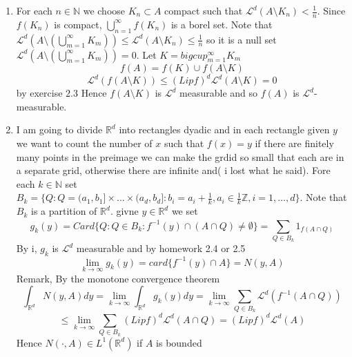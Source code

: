 \documentclass[11pt]{article}
\begin{document}
\begin{enumerate}
    \item For each $n \in \mathbb{N}$ we choose $K_n \subset A$ compact such that $ \mathcal{L}^{d}(A \setminus K_n) < \frac{1}{n}$. Since $f(K_n)$ is compact,  $\bigcup_{n=1}^{\infty}f(K_n)$ is a borel set. Note that $ \mathcal{L}^{d}(A \setminus ( \bigcup_{m=1}^{\infty}K_m)) \le \mathcal{L}^{d}(A \setminus K_n) \le \frac{1}{n}$ so
        it is a null set $ \mathcal{L}^{d}(A \setminus (\bigcup_{m=1}^{\infty}K_m)) = 0$. Let $K = bigcup_{m=1}^{\infty}K_m$ 
        \[
            f(A) = f(K) \cup f(A \setminus K)
        \] 
        \[
        \mathcal{L}^{d}(f(A \setminus K)) \le (Lip f)^{d} \mathcal{L}^{d}(A \setminus K)  = 0
        \] 
        by exercise $2.3$ 
        Hence $f(A \setminus K)$ is  $ \mathcal{L}^{d}$ measurable and so $f(A)$ is  $ \mathcal{L}^{d}$-measurable.
    \item 
        I am going to divide $ \mathbb{R}^{d}$ into rectangles dyadic and in each rectangle given $y$ we want to count the number of  $x$ such that  $f(x) = y$ if there are finitely many points in the preimage we can make the grdid so small that each are in a separate grid, otherwise there are infinite and( i lost what he said).
        Fore each  $k \in \mathbb{N}$ set  $B_k = \{Q : Q = (a_1,b_1] \times \dots \times (a_d,b_d] : b_i = a_i + \frac{1}{k}, a_i \in \frac{1}{k} \mathbb{Z}, i = 1,\dots,d\}$.
        Note that $ B_k$ is a partition of $ \mathbb{R}^{d}$. 
        givne $y \in \mathbb{R}^{d}$ we set
        \[
            g_k(y) = Card\{Q : Q \in B_k : f^{-1}(y) \cap (A \cap Q) \ne \emptyset\} = \sum_{Q \in B_k}^{}1_{f(A \cap Q)}
        \] 
        By i, $g_k$ is  $ \mathcal{L}^{d}$ measurable and by homework 2.4 or 2.5
        \[
            \lim_{k\to \infty}g_k(y) = card\{ f^{-1}(y) \cap A\} = N(y,A)
        \] 
        Remark, By the monotone convergence theorem 
        \[
        \int_{ \mathbb{R}^{d}}^{}N(y,A) dy = \lim_{k\to \infty} \int_{ \mathbb{R}^{d}}^{}g_k(y)dy = \lim_{k\to \infty} \sum_{ Q \in B_k}^{} \mathcal{L}^{d}(f^{-1}(A \cap Q))\]\[ \le \lim_{k\to \infty} \sum_{ Q \in B_k}^{} (Lip f)^{d} \mathcal{L}^{d}(A \cap Q) = (Lip f)^{d} \mathcal{L}^{d}(A)
        \] 
        Hence $N(\cdot, A) \in L^{1}( \mathbb{R}^{d})$ if $A$ is bounded
\end{enumerate}
\end{document}
